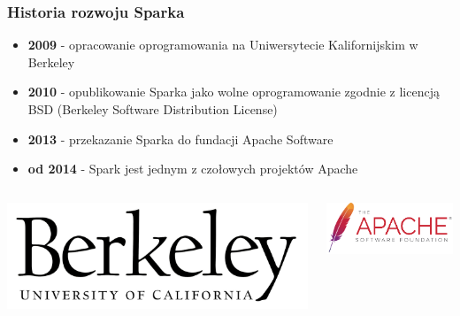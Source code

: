 \documentclass{beamer}\usepackage[]{graphicx}\usepackage[]{color}
\begin{document}
\begin{frame}
\frametitle{Historia rozwoju Sparka}
\begin{itemize}
\item \textbf{2009} - opracowanie oprogramowania na Uniwersytecie Kalifornijskim w Berkeley
\item \textbf{2010} - opublikowanie Sparka jako wolne oprogramowanie zgodnie z licencją BSD (Berkeley Software Distribution License)
\item \textbf{2013} - przekazanie Sparka do fundacji Apache Software
\item \textbf{od 2014} - Spark jest jednym z czołowych projektów Apache
\end{itemize}

\begin{columns}
  \begin{column}{0.5\textwidth}  %
    \begin{center}
      \includegraphics[width=\textwidth]{uni_logo.jpg}
     \end{center}
  \end{column}
  \begin{column}{0.5\textwidth}  %
    \begin{center}
      \includegraphics[width=\textwidth]{apache_logo.png}
     \end{center}
  \end{column}
\end{columns}
\end{frame}
\end{document}
